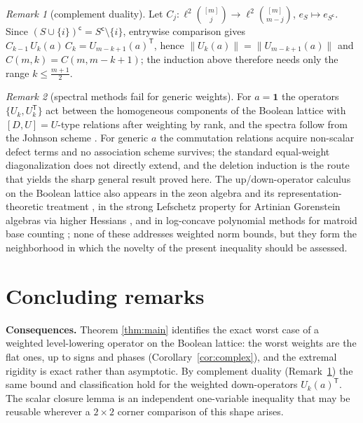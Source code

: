 \documentclass[11pt]{article}
\theoremstyle{remark}
\newtheorem{remark}{Remark}
\begin{document}
\begin{remark}[complement duality]\label{rem:duality}
Let $C_j:\ell^2\binom{[m]}{j}\to\ell^2\binom{[m]}{m-j}$, $e_S\mapsto
e_{S^{\mathsf c}}$. Since $(S\cup\{i\})^{\mathsf c}=S^{\mathsf c}\setminus\{i\}$,
entrywise comparison gives $C_{k-1}\,U_k(a)\,C_k=U_{m-k+1}(a)^{\mathsf T}$,
hence $\|U_k(a)\|=\|U_{m-k+1}(a)\|$ and $C(m,k)=C(m,m-k+1)$; the induction
above therefore needs only the range $k\le\frac{m+1}{2}$.
\end{remark}

\begin{remark}[spectral methods fail for generic weights]\label{rem:spectral}
For $a=\mathbf 1$ the operators $\{U_k,U_k^{\mathsf T}\}$ act between the
homogeneous components of the Boolean lattice with
$[D,U]=U$-type relations after weighting by rank, and the spectra follow
from the Johnson scheme \cite{srinivasan2011}. For generic $a$ the
commutation relations acquire non-scalar defect terms and no association
scheme survives; the standard equal-weight diagonalization does not directly
extend, and the deletion induction is the route that yields the sharp general
result proved here. The up/down-operator calculus on the Boolean lattice also
appears in the zeon algebra and its representation-theoretic treatment
\cite{feinsilver2008}, in the strong Lefschetz property for Artinian Gorenstein
algebras via higher Hessians \cite{maeno2009,gondim2017}, and in log-concave
polynomial methods for matroid base counting \cite{anari2024}; none of these
addresses weighted norm bounds, but they form the neighborhood in which the
novelty of the present inequality should be assessed.
\end{remark}

\section{Concluding remarks}\label{sec:remarks}

\textbf{Consequences.} Theorem \ref{thm:main} identifies the exact worst
case of a weighted level-lowering operator on the Boolean lattice: the
worst weights are the flat ones, up to signs and phases
(Corollary~\ref{cor:complex}), and the extremal rigidity is exact rather
than asymptotic. By complement duality
(Remark~\ref{rem:duality}) the same bound and classification hold for the
weighted down-operators $U_k(a)^{\mathsf T}$. The scalar closure lemma is
an independent one-variable inequality that may be reusable wherever a
$2\times2$ corner comparison of this shape arises.
\end{document}
